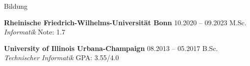 \begin{rubric}{Bildung}


\entry*[] \textbf{Rheinische Friedrich-Wilhelms-Universität Bonn} \hfill 10.2020 -- 09.2023  \newline
  M.Sc. \emph{Informatik}  \hfill Note:  1.7 \newline %

\entry*[] \textbf{University of Illinois Urbana-Champaign} \hfill 08.2013 -- 05.2017  \newline
 B.Sc. \emph{Technischer Informatik} \hfill GPA: 3.55/4.0 \newline %



\end{rubric}